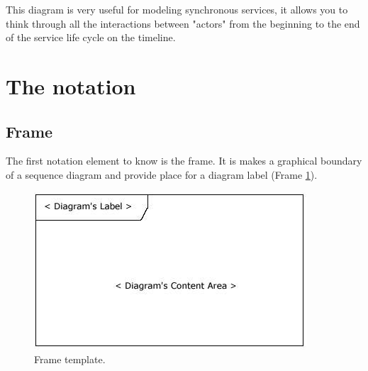 \documentclass[10pt,twoside,slovak,a4paper]{article}
\begin{document}
This diagram is very useful for modeling synchronous services, it allows you to think through all the interactions between "actors" from the beginning to the end of the service life cycle on the timeline.

\begin{figure}[tbh]
\centering
\end{figure}



\section{The notation} \label{notation}




\subsection{Frame} \label{notation:frame}
The first notation element to know is the frame. It is makes a graphical boundary of a sequence diagram and provide place for a diagram label (Frame \ref{fig:frame}). 
\begin{figure}[tbh]
\centering
\includegraphics[scale=0.5]{frame.jpg}
\caption{Frame template.}
\label{fig:frame}
\end{figure}
\end{document}
